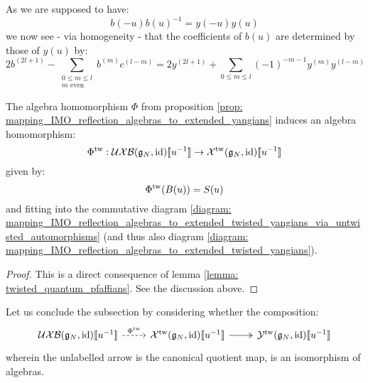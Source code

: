             As we are supposed to have:
                $$b(-u) b(u)^{-1} = y(-u) y(u)$$
            we now see - via homogeneity - that the coefficients of $b(u)$ are determined by those of $y(u)$ by:
                \begin{equation} \label{equation: b_cofficients_in_terms_of_y_coefficients}
                    2b^{(2l + 1)} - \sum_{ \substack{ 0 \leq m \leq l \\ \text{$m$ even} } } b^{(m)} c^{(l - m)} = 2y^{(2l + 1)} + \sum_{0 \leq m \leq l} (-1)^{-m - 1} y^{(m)} y^{(l - m)}
                \end{equation}
                
            \begin{proposition} \label{prop: mapping_IMO_reflection_algebras_to_extended_untwisted_yangians_via_extended_twisted_yangians}
                The algebra homomorphism $\Phi$ from proposition \ref{prop: mapping_IMO_reflection_algebras_to_extended_yangians} induces an algebra homomorphism:
                    $$\Phi^{\mathrm{tw}}: \mathcal{UXB}(\mathfrak{g}_N, \mathrm{id})[\![u^{-1}]\!] \to \mathcal{X}^{\mathrm{tw}}(\mathfrak{g}_N, \mathrm{id})[\![u^{-1}]\!]$$
                given by:
                    $$\Phi^{\mathrm{tw}}( B(u) ) = S(u)$$
                and fitting into the commutative diagram \eqref{diagram: mapping_IMO_reflection_algebras_to_extended_twisted_yangians_via_untwisted_automorphisms} (and thus also diagram \eqref{diagram: mapping_IMO_reflection_algebras_to_extended_twisted_yangians}).
            \end{proposition}
                \begin{proof}
                    This is a direct consequence of lemma \ref{lemma: twisted_quantum_pfaffians}. See the discussion above.
                \end{proof}

            Let us conclude the subsection by considering whether the composition:
                \begin{equation} \label{diagram: mapping_IMO_reflection_algebras_to_BCD0_twisted_yangians}
                    \begin{tikzcd}
                        {\UXB(\g_N, \id)[\![u^{-1}]\!]} & {\calX^{\tw}(\g_N, \id)[\![u^{-1}]\!]} & {\calY^{\tw}(\g_N, \id)[\![u^{-1}]\!]}
                        \arrow["{\Phi^{\tw}}", dashed, from=1-1, to=1-2]
                        \arrow[two heads, from=1-2, to=1-3]
                    \end{tikzcd}
                \end{equation}
            wherein the unlabelled arrow is the canonical quotient map, is an isomorphism of algebras. 

